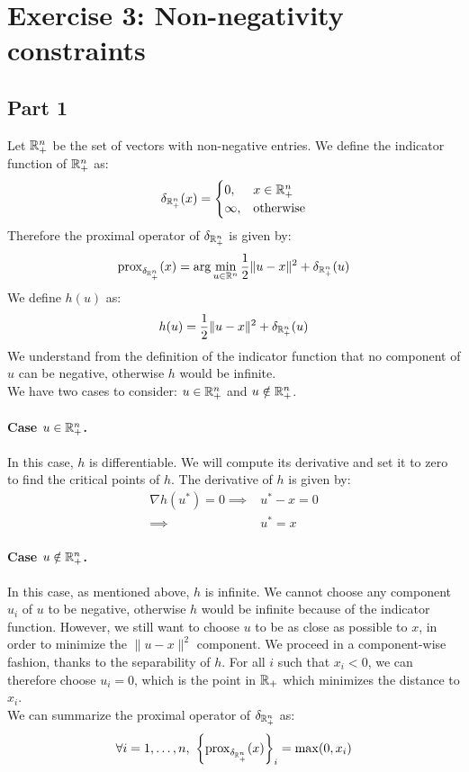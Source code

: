 \documentclass[12pt]{article}
\newcommand{\prox}{\operatorname{prox}}
\begin{document}
\section{Exercise 3: Non-negativity constraints}
\subsection{Part 1}
\label{sec:part1}
Let $\mathbb{R}_+^n$ be the set of vectors with non-negative entries. We define the indicator function of $\mathbb{R}_+^n$ as:
\begin{equation*}
  \delta_{\mathbb{R}_+^n} (x) =
  \begin{cases}
    0,      & x \in \mathbb{R}_+^n     \\
    \infty, & \text{otherwise}
  \end{cases}
\end{equation*}
Therefore the proximal operator of $\delta_{\mathbb{R}_+^n}$ is given by:
\begin{equation*}
  \prox_{\delta_{\R_+^n}}(x) = \arg\min_{u \in \R^n} \frac{1}{2}\|u-x\|^2 + \delta_{\R_+^n} (u)
\end{equation*}
We define $h(u)$ as:
\begin{equation*}
  h(u) = \frac{1}{2}\|u-x\|^2 + \delta_{\mathbb{R}_+^n} (u)
\end{equation*}
We understand from the definition of the indicator function that no component of $u$ can be negative, otherwise $h$ would be infinite. \\
We have two cases to consider: $u \in \mathbb{R}_+^n$ and $u \notin \mathbb{R}_+^n$.
\paragraph{Case $u \in \mathbb{R}_+^n$.}
In this case, $h$ is differentiable. We will compute its derivative and set it to zero to find the critical points of $h$. The derivative of $h$ is given by:
\begin{align*}
  \nabla h(u^*) = 0
  \implies &
  u^* - x = 0 \\
  \implies &
  u^* = x
\end{align*}
\paragraph{Case $u \notin \mathbb{R}_+^n$.}
In this case, as mentioned above, $h$ is infinite. We cannot choose any component $u_i$ of $u$ to be negative, otherwise $h$ would be infinite because of the indicator function. However, we still want to choose $u$ to be as close as possible to $x$, in order to minimize the $\|u-x\|^2$ component. We proceed in a component-wise fashion, thanks to the separability of $h$. For all $i$ such that $x_i < 0$, we can therefore choose $u_i = 0$, which is the point in $\mathbb{R}_+$ which minimizes the distance to $x_i$. \\
We can summarize the proximal operator of $\delta_{\mathbb{R}_+^n}$ as:
\begin{equation*}
  \forall i=1, \ldots, n,\ \left\{\prox_{\delta_{\R_+^n}}(x)\right\}_i = \max(0, x_i)
\end{equation*}
\end{document}
